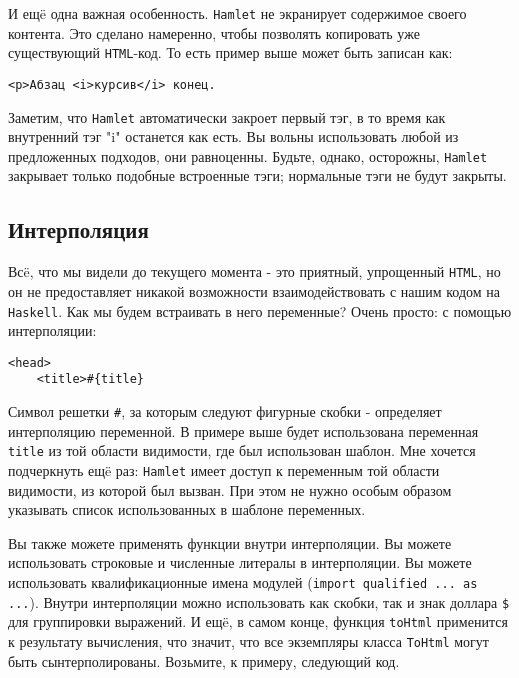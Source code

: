 И ещë одна важная особенность. \texttt{Hamlet} не экранирует содержимое своего контента.
Это сделано намеренно, чтобы позволять копировать уже существующий \texttt{HTML}-код.
То есть пример выше может быть записан как:
\begin{lstlisting}
<p>Абзац <i>курсив</i> конец.
\end{lstlisting}

Заметим, что \texttt{Hamlet} автоматически закроет первый тэг, в то время как внутренний
тэг "i" останется как есть. Вы вольны использовать любой из предложенных
подходов, они равноценны. Будьте, однако, осторожны, \texttt{Hamlet} закрывает только
подобные встроенные тэги; нормальные тэги не будут закрыты.

\subsection{Интерполяция}
Всë, что мы видели до текущего момента - это приятный, упрощенный \texttt{HTML}, но он
не предоставляет никакой возможности взаимодействовать с нашим кодом на \texttt{Haskell}.
Как мы будем встраивать в него переменные? Очень просто: с помощью интерполяции:

\begin{lstlisting}
<head>
    <title>#{title}
\end{lstlisting}

Символ решетки \verb'#', за которым следуют фигурные скобки - определяет интерполяцию
переменной. В примере выше будет использована переменная \lstinline!title! из той
области видимости, где был использован шаблон. Мне хочется подчеркнуть ещë раз:
\texttt{Hamlet} имеет доступ к переменным той области видимости, из которой был вызван.
При этом не нужно особым образом указывать список использованных в шаблоне переменных.

Вы также можете применять функции внутри интерполяции. Вы можете использовать
строковые и численные литералы в интерполяции. Вы можете использовать 
квалификационные имена модулей (\lstinline!import qualified ... as ...!). Внутри
интерполяции можно использовать как скобки, так и знак доллара \texttt{\$}
для группировки выражений. И ещë, в самом конце, функция \lstinline!toHtml!
применится к результату вычисления, что значит, что все экземпляры класса 
\lstinline!ToHtml! могут быть сынтерполированы. Возьмите, к примеру, следующий код.

